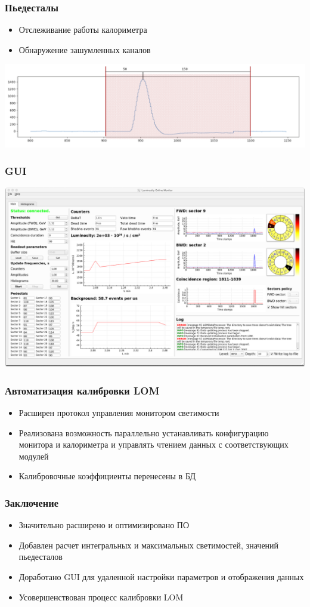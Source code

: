 \documentclass{beamer}
\begin{document}
\begin{frame}
\frametitle{Пьедесталы}
    \begin{itemize}
        \item Отслеживание работы калориметра
        \item Обнаружение зашумленных каналов
    \end{itemize}
    \includegraphics[width=\textwidth]{Pedestal.png}
\end{frame}

\begin{frame}
\frametitle{GUI}
    \includegraphics[width=\textwidth]{GUI3}
\end{frame}

\begin{frame}
\frametitle{Автоматизация калибровки LOM}
    \begin{itemize}
        \item Расширен протокол управления монитором светимости
        \item Реализована возможность параллельно устанавливать конфигурацию монитора и калориметра и управлять чтением данных с соответствующих модулей
        \item Калибровочные коэффициенты перенесены в БД
    \end{itemize}
\end{frame}

\begin{frame}
\frametitle{Заключение}
    \begin{itemize}
        \item Значительно расширено и оптимизировано ПО
        \item Добавлен расчет интегральных и максимальных светимостей, значений пьедесталов
        \item Доработано GUI для удаленной настройки параметров и отображения данных
        \item Усовершенствован процесс калибровки LOM
    \end{itemize}
\end{frame}
\end{document}

